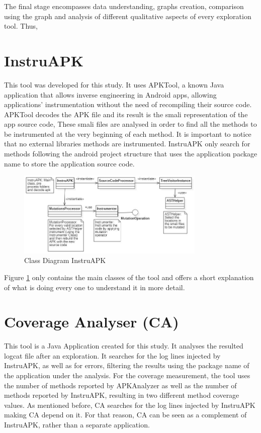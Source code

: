The final stage encompasses data understanding, graphs creation, comparison using the graph and analysis of different qualitative aspects of every exploration tool. Thus, 



\section{InstruAPK}\label{sec:instruAPK}

This tool was developed for this study. It uses APKTool, a known Java application that allows inverse engineering in Android apps, allowing applications' instrumentation without the need of recompiling their source code. APKTool decodes the APK file and its result is the smali representation of the app source code, These smali files are analysed in order to find all the methods to be instrumented at the very beginning of each method. It is important to notice that no external libraries methods are instrumented. InstruAPK only search for methods following the android project structure that uses the application package name to store the application source code.

\begin{figure}[h]
\centering
\includegraphics[width=0.8\textwidth]{../Figures/ClassDiagramInstruAPK.jpg}
\caption{Class Diagram InstruAPK}\label{fig:instruAPK}
\end{figure}

Figure \ref{fig:instruAPK} only contains the main classes of the tool and offers a short explanation of what is doing every one to understand it in more detail.

\section{Coverage Analyser (CA)}\label{sec:ca}

This tool is a Java Application created for this study. It analyses the resulted logcat file after an exploration. It searches for the log lines injected by InstruAPK, as well as for errors, filtering the results using the package name of the application under the analysis. For the coverage measurement, the tool uses the number of methods reported by APKAnalyzer as well as the number of methods reported by InstruAPK, resulting in two different method coverage values. As mentioned before, CA searches for the log lines injected by InstruAPK making CA depend on it. For that reason, CA can be seen as a complement of InstruAPK, rather than a separate application.

